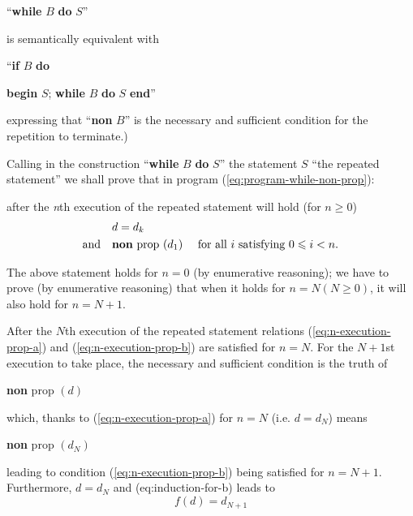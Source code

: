 {
	\setlength{\parindent}{8em}
	\hspace{-.5em}``\textbf{while} $B$ \textbf{do} $S$''
}
\medskip

\noindent
is semantically equivalent with
\medskip

{
	\setlength{\parindent}{8em}
	\hspace{-.5em}``\textbf{if} $B$ \textbf{do}
	
	\quad \textbf{begin} $S$; \textbf{while} $B$ \textbf{do} $S$ \textbf{end}''
}
\medskip

\noindent
expressing that ``\textbf{non} $B$'' is the necessary and sufficient condition for the repetition to terminate.)

Calling in the construction ``\textbf{while} $B$ \textbf{do} $S$'' the statement $S$ ``the repeated statement'' we shall prove that in program (\ref{eq:program-while-non-prop}):

\quad after the \textit{n}th execution of the repeated statement will hold (for $n \geqslant 0$)
\begin{subequations}
	\label{eq:n-execution-prop}
	\begin{align}
		\label{eq:n-execution-prop-a}
		&d=d_k& \\
		\label{eq:n-execution-prop-b}
		\text{and}\quad &\text{\textbf{non} prop }(d_1) &\text{ for all } i \text{ satisfying } 0 \leqslant i < n.
	\end{align}
\end{subequations}

The above statement holds for $n = 0$ (by enumerative reasoning); we have to prove (by enumerative reasoning) that when it holds for $n = N(N \geqslant 0)$, it will also hold for $n = N + 1$.

After the $N$th execution of the repeated statement relations (\ref{eq:n-execution-prop-a}) and (\ref{eq:n-execution-prop-b}) are satisfied for $n = N$. For the $N + 1$st execution to take place, the necessary and sufficient condition is the truth of
\begin{center}
	\textbf{non} prop $(d)$
\end{center}

\noindent
which, thanks to (\ref{eq:n-execution-prop-a}) for $n = N$ (i.e. $d = d_N$) means
\begin{center}
	\textbf{non} prop $(d_N)$
\end{center}

\noindent 
leading to condition (\ref{eq:n-execution-prop-b}) being satisfied for $n = N + 1$. Furthermore, $d = d_N$ and (eq:induction-for-b) leads to
$$
f(d) = d_{N + 1}
$$

